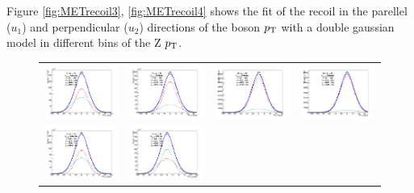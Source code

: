 Figure \ref{fig:METrecoil3}, \ref{fig:METrecoil4}  shows the fit of the recoil in the parellel ($u_{1}$) and perpendicular ($u_{2}$) directions of the boson $p_{\mathrm{T}}$ with a double gaussian model in different bins of the Z $p_{\mathrm{T}}$.

\newpage
\begin{figure}[!ht]
\begin{tabular}{cccc}
  \includegraphics[width=100pt]{figuresARC/recoil/FITS/Data/pfu1fit_0.png} &
  \includegraphics[width=100pt]{figuresARC/recoil/FITS/Data/pfu1fit_1.png} &
  \includegraphics[width=100pt]{figuresARC/recoil/FITS/Data/pfu1fit_2.png} &
  \includegraphics[width=100pt]{figuresARC/recoil/FITS/Data/pfu1fit_3.png} \\
  \includegraphics[width=100pt]{figuresARC/recoil/FITS/Data/pfu2fit_0.png} &
  \includegraphics[width=100pt]{figuresARC/recoil/FITS/Data/pfu2fit_1.png} &

\end{tabular}
\end{figure}
